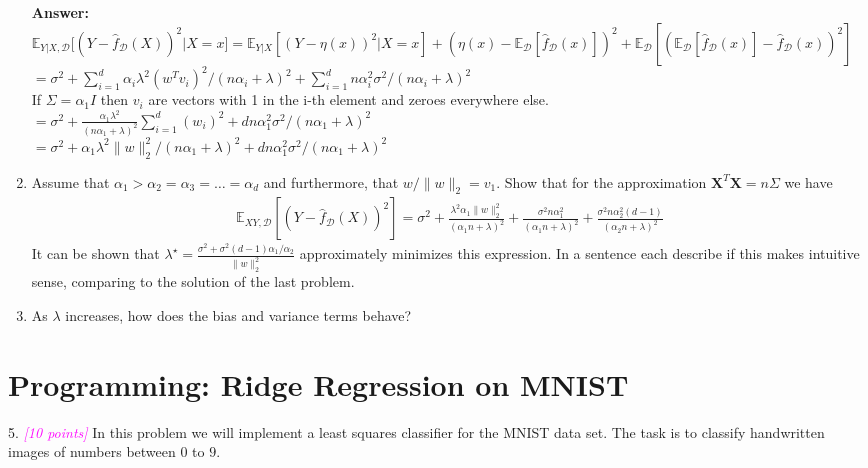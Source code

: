 \documentclass{article}
\newcommand{\1}{\mathbf{1}}
\def\E{\mathbb{E}}
\newcommand{\mb}[1]{\mathbf{#1}}
\newcommand{\mc}[1]{\mathcal{#1}}
\newcommand{\grade}[1]{\small\textcolor{magenta}{\emph{[#1 points]}} \normalsize}
\begin{document}
\begin{enumerate}
    \textbf{Answer:}\\
    
    $\E_{Y|X,\mc{D}}\big[(Y-\widehat{f}_{\mc{D}}(X))^2 |X=x \big] = \E_{Y|X}[ (Y-\eta(x))^2 | X=x] + (\eta(x)-\E_{\mc{D}}[\widehat{f}_{\mc{D}}(x)])^2 + \E_{\mc{D}}[ ( \E_{\mc{D}}[\widehat{f}_{\mc{D}}(x)] - \widehat{f}_{\mc{D}}(x))^2]$
    $=\sigma^2 +\sum_{i=1}^d \alpha_i \lambda^2 (w^T v_i)^2 /(n\alpha_i + \lambda) ^2 +\sum_{i=1}^d n \alpha_i^2 \sigma^2 /(n\alpha_i + \lambda)^2$\\
    
    If $\Sigma =\alpha_1 I$ then $v_i$ are vectors with 1 in the i-th element and zeroes everywhere else.\\
    $=\sigma^2 +\frac{\alpha_1 \lambda^2}  {(n\alpha_1 + \lambda) ^2} \sum_{i=1}^d (w_i)^2+d n \alpha_1^2 \sigma^2 /(n\alpha_1 + \lambda)^2$\\
     $=\sigma^2 +\alpha_1 \lambda^2 \|w\|_2^2 /(n\alpha_1 + \lambda) ^2 +d n \alpha_1^2 \sigma^2 /(n\alpha_1 + \lambda)^2$\\
    
    
    \item Assume that $\alpha_1 > \alpha_2 = \alpha_3 = \dots = \alpha_d$ and furthermore, that $w/\|w\|_2 = v_1$. Show that for the approximation $\mb{X}^T \mb{X} = n \Sigma$ we have
    \begin{align*}
    \E_{XY,\mc{D}}[ (Y-\widehat{f}_{\mc{D}}(X))^2] = \sigma^2 + \frac{\lambda^2 \alpha_1 \|w\|_2^2}{(\alpha_1 n+\lambda)^2} + \frac{\sigma^2 n \alpha_1^2}{(\alpha_1 n + \lambda)^2} + \frac{\sigma^2 n \alpha_2^2 (d-1)}{(\alpha_2 n + \lambda)^2}
    \end{align*}
    It can be shown that $\lambda^\star = \frac{\sigma^2 + \sigma^2(d-1)\alpha_1/\alpha_2}{\|w\|_2^2}$ approximately minimizes this expression. 
    In a sentence each describe if this makes intuitive sense, comparing to the solution of the last problem.
    
    
    \item As $\lambda$ increases, how does the bias and variance terms behave?
     
\end{enumerate}


\section{Programming: Ridge Regression on MNIST}
5. \grade{10} In this problem we will implement a least squares classifier for the MNIST data set. The task
is to classify handwritten images of numbers between $0$ to $9$.\\
\end{document}
